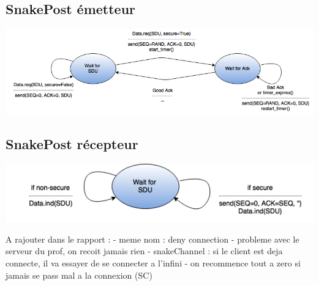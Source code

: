 \documentclass[a4paper]{article}
\begin{document}
\subsection{SnakePost émetteur}
\begin{center}
\includegraphics[scale=0.6]{sp_emetteur.png}
\end{center}
\subsection{SnakePost récepteur}
\begin{center}
\includegraphics[scale=0.7]{sp_recepteur.png}
\end{center}

A rajouter dans le rapport :
- meme nom : deny connection
- probleme avec le serveur du prof, on recoit jamais rien
- snakeChannel : si le client est deja connecte, il va essayer de se connecter a l'infini
- on recommence tout a zero si jamais se pass mal a la connexion (SC)
\end{document}
